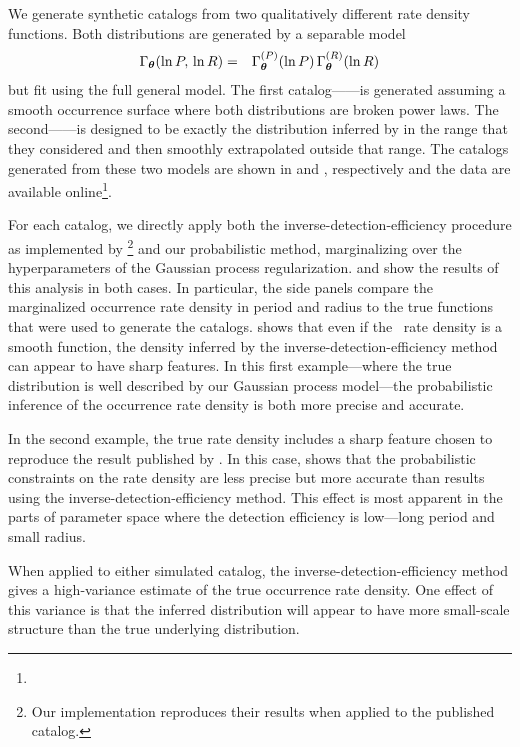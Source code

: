 We generate synthetic catalogs from two qualitatively different rate density
functions.
Both distributions are generated by a separable model
\begin{eqnarray}
\Gamma_{{\boldsymbol{{\theta}}}} (\ln P,\,\ln R) &=&
    \Gamma_{{\boldsymbol{{\theta}}}}^{(P)}(\ln P)\,
    \Gamma_{{\boldsymbol{{\theta}}}}^{(R)}(\ln R)
\end{eqnarray}
but fit using the full general model.
The first catalog---\modela---is generated assuming a smooth occurrence
surface where both distributions are broken power laws.
The second---\modelb---is designed to be exactly the distribution inferred by
\citet{Petigura:2013} in the range that they considered and then smoothly
extrapolated outside that range.
The catalogs generated from these two models are shown in 
and , respectively and the data are available
online\footnote{\resultsurl}.

For each catalog, we directly apply both the inverse-detection-efficiency
procedure as implemented by \citealt{Petigura:2013}\footnote{Our implementation
reproduces their results when applied to the published catalog.} and our
probabilistic method, marginalizing over the hyperparameters of the Gaussian
process regularization.
 and  show the results of this
analysis in both cases.
In particular, the side panels compare the marginalized occurrence rate
density in period and radius to the true functions that were used to
generate the catalogs.
 shows that even if the \True\ rate density is a smooth
function, the density inferred by the inverse-detection-efficiency method can
appear to have sharp features.
In this first example---where the true distribution is well described by our
Gaussian process model---the probabilistic inference of the occurrence rate
density is both more precise and accurate.

In the second example, the true rate density includes a sharp feature chosen
to reproduce the result published by \citet{Petigura:2013}.
In this case,  shows that the probabilistic
constraints on the rate density are less precise but more accurate than
results using the inverse-detection-efficiency method.
This effect is most apparent in the parts of parameter space where the
detection efficiency is low---long period and small radius.

When applied to either simulated catalog, the inverse-detection-efficiency
method gives a high-variance estimate of the true occurrence rate density.
One effect of this variance is that the inferred distribution will appear to
have more small-scale structure than the true underlying distribution.

